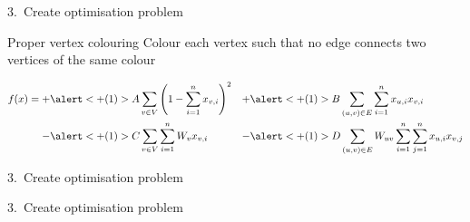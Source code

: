 \documentclass[handout]{beamer}
\begin{document}
\begin{frame}{3.\ Create optimisation problem}
    \begin{exampleblock}{Proper vertex colouring}
        \vspace{0.1em}
        Colour each vertex such that no edge connects two vertices of the same colour
    \end{exampleblock}

    \begin{align*}
        f(x) = +&\alert<+(1)>{A\sum_{v \in V}\left(1-\sum_{i=1}^{n} x_{v,i}\right)^2} &+ &\alert<+(1)>{B\sum_{(u,v) \in E}\sum_{i=1}^n x_{u,i}x_{v,i}} \\ -&\alert<+(1)>{C\sum_{v \in V}\sum_{i=1}^n W_vx_{v,i}} &-&\alert<+(1)>{D\sum_{(u,v)\in E}W_{uv}\sum_{i=1}^n\sum_{j=1}^n x_{u,i}x_{v,j}}
    \end{align*}

\end{frame}

\begin{frame}{3.\ Create optimisation problem}
    
\end{frame}

\begin{frame}{3.\ Create optimisation problem}
    
\end{frame}
\end{document}
